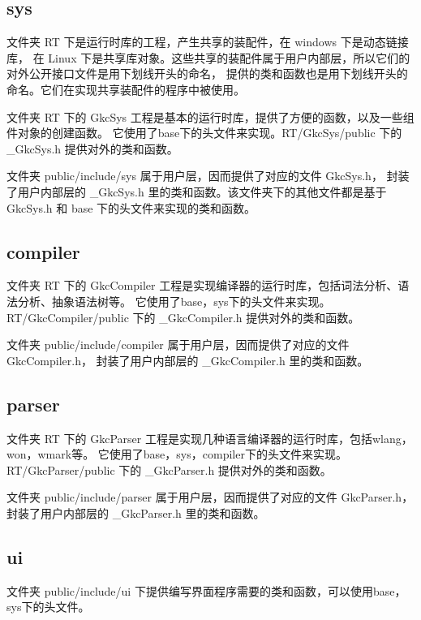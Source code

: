 \subsection{sys}

文件夹 RT 下是运行时库的工程，产生共享的装配件，在 windows 下是动态链接库，
在 Linux 下是共享库对象。这些共享的装配件属于用户内部层，所以它们的对外公开接口文件是用下划线开头的命名，
提供的类和函数也是用下划线开头的命名。它们在实现共享装配件的程序中被使用。

文件夹 RT 下的 GkcSys 工程是基本的运行时库，提供了方便的函数，以及一些组件对象的创建函数。
它使用了base下的头文件来实现。RT/GkcSys/public 下的 \_GkcSys.h 提供对外的类和函数。

文件夹 public/include/sys 属于用户层，因而提供了对应的文件 GkcSys.h，
封装了用户内部层的 \_GkcSys.h 里的类和函数。该文件夹下的其他文件都是基于 GkcSys.h 和 base 下的头文件来实现的类和函数。

\subsection{compiler}

文件夹 RT 下的 GkcCompiler 工程是实现编译器的运行时库，包括词法分析、语法分析、抽象语法树等。
它使用了base，sys下的头文件来实现。RT/GkcCompiler/public 下的 \_GkcCompiler.h 提供对外的类和函数。

文件夹 public/include/compiler 属于用户层，因而提供了对应的文件 GkcCompiler.h，
封装了用户内部层的 \_GkcCompiler.h 里的类和函数。

\subsection{parser}

文件夹 RT 下的 GkcParser 工程是实现几种语言编译器的运行时库，包括wlang，won，wmark等。
它使用了base，sys，compiler下的头文件来实现。RT/GkcParser/public 下的 \_GkcParser.h 提供对外的类和函数。

文件夹 public/include/parser 属于用户层，因而提供了对应的文件 GkcParser.h，
封装了用户内部层的 \_GkcParser.h 里的类和函数。

\subsection{ui}

文件夹 public/include/ui 下提供编写界面程序需要的类和函数，可以使用base，sys下的头文件。
